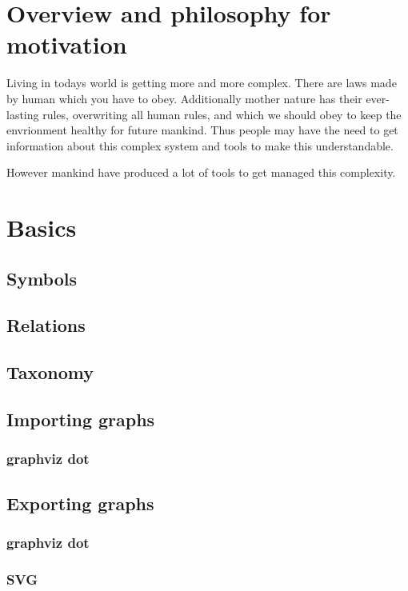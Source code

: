 \documentclass[a4paper, 12pt]{scrbook}
\author{\MyVorname \quad \MyNachname}
\title{\MyTitel}
\begin{document}
\tableofcontents
\pagebreak

\chapter{Overview and philosophy for motivation}
Living in todays world is getting more and more complex. There are laws made by human which you have to obey. Additionally mother nature has their ever-lasting rules, overwriting all human rules, and which we should obey to keep the envrionment healthy for future mankind. Thus people may have the need to get information about this complex system and tools to make this understandable.

However mankind have produced a lot of tools to get managed this complexity.
\chapter{Basics}
\section{Symbols}
\section{Relations}
\section{Taxonomy}
\section{Importing graphs}
\subsection{graphviz dot}
\section{Exporting graphs}
\subsection{graphviz dot}
\subsection{SVG}
\end{document}
